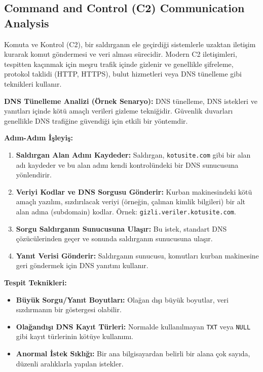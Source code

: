 \subsection{Command and Control (C2) Communication Analysis}

Komuta ve Kontrol (C2), bir saldırganın ele geçirdiği sistemlerle uzaktan iletişim kurarak komut göndermesi ve veri alması sürecidir. Modern C2 iletişimleri, tespitten kaçınmak için meşru trafik içinde gizlenir ve genellikle şifreleme, protokol taklidi (HTTP, HTTPS), bulut hizmetleri veya DNS tünelleme gibi teknikleri kullanır.

\textbf{DNS Tünelleme Analizi (Örnek Senaryo):}
DNS tünelleme, DNS istekleri ve yanıtları içinde kötü amaçlı verileri gizleme tekniğidir. Güvenlik duvarları genellikle DNS trafiğine güvendiği için etkili bir yöntemdir.

\textbf{Adım-Adım İşleyiş:}
\begin{enumerate}
    \item \textbf{Saldırgan Alan Adını Kaydeder:} Saldırgan, \texttt{kotusite.com} gibi bir alan adı kaydeder ve bu alan adını kendi kontrolündeki bir DNS sunucusuna yönlendirir.
    \item \textbf{Veriyi Kodlar ve DNS Sorgusu Gönderir:} Kurban makinesindeki kötü amaçlı yazılım, sızdırılacak veriyi (örneğin, çalınan kimlik bilgileri) bir alt alan adına (subdomain) kodlar. Örnek: \texttt{gizli.veriler.kotusite.com}.
    \item \textbf{Sorgu Saldırganın Sunucusuna Ulaşır:} Bu istek, standart DNS çözücülerinden geçer ve sonunda saldırganın sunucusuna ulaşır.
    \item \textbf{Yanıt Verisi Gönderir:} Saldırganın sunucusu, komutları kurban makinesine geri göndermek için DNS yanıtını kullanır.
\end{enumerate}

\textbf{Tespit Teknikleri:}
\begin{itemize}
    \item \textbf{Büyük Sorgu/Yanıt Boyutları:} Olağan dışı büyük boyutlar, veri sızdırmanın bir göstergesi olabilir.
    \item \textbf{Olağandışı DNS Kayıt Türleri:} Normalde kullanılmayan \texttt{TXT} veya \texttt{NULL} gibi kayıt türlerinin kötüye kullanımı.
    \item \textbf{Anormal İstek Sıklığı:} Bir ana bilgisayardan belirli bir alana çok sayıda, düzenli aralıklarla yapılan istekler.
\end{itemize}

